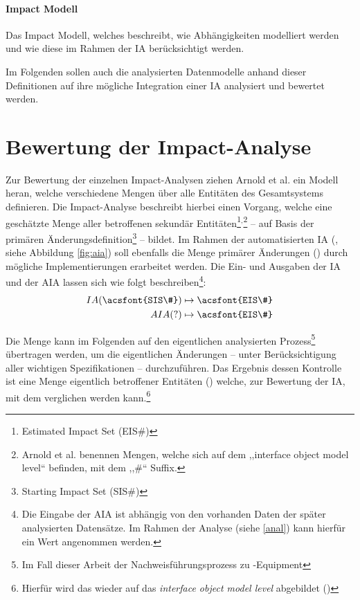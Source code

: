 \paragraph{Impact Modell}
    Das Impact Modell, welches beschreibt, wie Abhängigkeiten modelliert werden und wie diese im Rahmen der \ac{IA} berücksichtigt werden.

\bigskip
\noindent
Im Folgenden sollen auch die analysierten Datenmodelle anhand dieser Definitionen auf ihre mögliche Integration einer \ac{IA} analysiert und bewertet werden.

\pagebreak
\section{Bewertung der Impact-Analyse}
\label{model_ia_bew}

Zur Bewertung der einzelnen Impact-Analysen ziehen Arnold et al. ein Modell heran, welche verschiedene Mengen über alle Entitäten des Gesamtsystems definieren.
Die Impact-Analyse beschreibt hierbei einen Vorgang, welche eine geschätzte Menge aller betroffenen sekundär Entitäten\footnote{Estimated Impact Set (EIS\#)}$^,$\footnote{Arnold et al. benennen Mengen, welche sich auf dem ,,interface object model level`` befinden, mit dem ,,\#`` Suffix.} -- auf Basis der primären Änderungsdefinition\footnote{Starting Impact Set (SIS\#)} -- bildet.
Im Rahmen der automatisierten \ac{IA} (, siehe Abbildung \ref{fig:aia}) soll ebenfalls die Menge primärer Änderungen () durch mögliche Implementierungen erarbeitet werden.
Die Ein- und Ausgaben der \acf{IA} und der \acf{AIA} lassen sich wie folgt beschreiben\footnote{Die Eingabe der \ac{AIA} ist abhängig von den vorhanden Daten der später analysierten Datensätze. Im Rahmen der Analyse (siehe \ref{anal}) kann hierfür ein Wert angenommen werden.}:
\begin{align}
    IA(\text{\acsfont{SIS\#}}) &\mapsto \text{\acsfont{EIS\#}} \\
    AIA(?)                     &\mapsto \text{\acsfont{EIS\#}}
\end{align}

\noindent
Die  Menge kann im Folgenden auf den eigentlichen analysierten Prozess\footnote{Im Fall dieser Arbeit der Nachweisführungsprozess zu \atmans-Equipment} übertragen werden, um die eigentlichen Änderungen -- unter Berücksichtigung  aller wichtigen Spezifikationen -- durchzuführen.
Das Ergebnis dessen Kontrolle ist eine Menge eigentlich betroffener Entitäten () welche, zur Bewertung der \ac{IA}, mit dem  verglichen werden kann.\footnote{Hierfür wird das  wieder auf das \textit{interface object model level} abgebildet ()}

